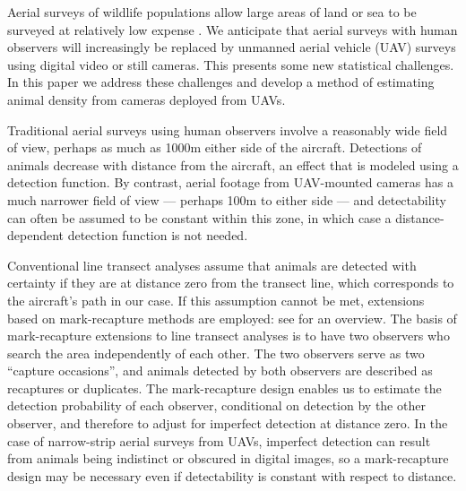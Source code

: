 \documentclass[useAMS, usenatbib, referee]{biom}\usepackage[]{graphicx}\usepackage[]{color}
\begin{document}

  Aerial surveys of wildlife populations allow large areas of land or sea to be surveyed at relatively low expense \citep{Henkel+al:07,Hammond+al:17}. We anticipate that aerial surveys with human observers will increasingly be replaced by unmanned aerial vehicle (UAV) surveys using digital video or still cameras. This presents some new statistical challenges. In this paper we address these challenges and develop a method of estimating animal density from cameras deployed from UAVs.

Traditional aerial surveys using human observers involve a reasonably wide field of view, perhaps as much as 1000m either side of the aircraft. Detections of animals decrease with distance from the aircraft, an effect that is modeled using a detection function. By contrast, aerial footage from UAV-mounted cameras has a much narrower field of view --- perhaps 100m to either side --- and detectability can often be assumed to be constant within this zone, in which case a distance-dependent detection function is not needed.

Conventional line transect analyses assume that animals are detected with certainty if they are at distance zero from the transect line, which corresponds to the aircraft's path in our case. If this assumption cannot be met, extensions based on mark-recapture methods are employed: see \cite{Burt+al:14} for an overview. The basis of mark-recapture extensions to line transect analyses is to have two observers who search the area independently of each other. The two observers serve as two ``capture occasions'', and animals detected by both observers are described as recaptures or duplicates. The mark-recapture design enables us to estimate the detection probability of each observer, conditional on detection by the other observer, and therefore to adjust for imperfect detection at distance zero. In the case of narrow-strip aerial surveys from UAVs, imperfect detection can result from animals being indistinct or obscured in digital images, so a mark-recapture design may be necessary even if detectability is constant with respect to distance.
\end{document}

